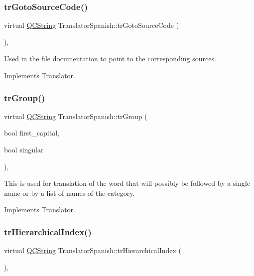 \subsubsection{\texorpdfstring{trGotoSourceCode()}{trGotoSourceCode()}}
{\footnotesize\ttfamily virtual \mbox{\hyperlink{class_q_c_string}{Q\+C\+String}} Translator\+Spanish\+::tr\+Goto\+Source\+Code (\begin{DoxyParamCaption}{ }\end{DoxyParamCaption})\hspace{0.3cm}{\ttfamily [inline]}, {\ttfamily [virtual]}}

Used in the file documentation to point to the corresponding sources. 

Implements \mbox{\hyperlink{class_translator}{Translator}}.

\mbox{\label{class_translator_spanish_a399fe98fd2d9fbeb14d0a9deaf8d4009}} 
\subsubsection{\texorpdfstring{trGroup()}{trGroup()}}
{\footnotesize\ttfamily virtual \mbox{\hyperlink{class_q_c_string}{Q\+C\+String}} Translator\+Spanish\+::tr\+Group (\begin{DoxyParamCaption}\item[{bool}]{first\+\_\+capital,  }\item[{bool}]{singular }\end{DoxyParamCaption})\hspace{0.3cm}{\ttfamily [inline]}, {\ttfamily [virtual]}}

This is used for translation of the word that will possibly be followed by a single name or by a list of names of the category. 

Implements \mbox{\hyperlink{class_translator}{Translator}}.

\mbox{\label{class_translator_spanish_a69c2f60944b76aa37530c77c3eafb5e4}} 
\subsubsection{\texorpdfstring{trHierarchicalIndex()}{trHierarchicalIndex()}}
{\footnotesize\ttfamily virtual \mbox{\hyperlink{class_q_c_string}{Q\+C\+String}} Translator\+Spanish\+::tr\+Hierarchical\+Index (\begin{DoxyParamCaption}{ }\end{DoxyParamCaption})\hspace{0.3cm}{\ttfamily [inline]}, {\ttfamily [virtual]}}

